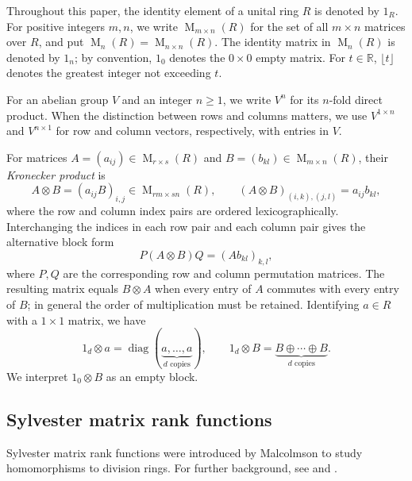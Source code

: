 \documentclass[11pt]{amsart}
\DeclareMathOperator{\Mat}{M}
\DeclareMathOperator{\diag}{diag}
\theoremstyle{definition}
\theoremstyle{remark}
\begin{document}
Throughout this paper, the identity element of a unital ring \(R\) is denoted by \(1_R\).
For positive integers \(m,n\), we write \(\Mat_{m\times n}(R)\) for the set of
all \(m\times n\) matrices over \(R\), and put \(\Mat_n(R)=\Mat_{n\times
  n}(R)\).
The identity matrix in \(\Mat_n(R)\) is denoted by \(1_n\); by convention,
\(1_0\) denotes the \(0\times0\) empty matrix.
For $t\in\mathbb R$, $\lfloor t\rfloor$ denotes the greatest integer
not exceeding $t$.

For an abelian group $V$ and an integer $n\geq1$, we write $V^n$ for its
$n$-fold direct product.
When the distinction between rows and columns matters, we use \(V^{1\times n}\)
and \(V^{n\times1}\) for row and column vectors, respectively, with entries in
\(V\).

For matrices $A=(a_{ij})\in\Mat_{r\times s}(R)$ and
$B=(b_{kl})\in\Mat_{m\times n}(R)$, their \emph{Kronecker product} is
\[
A\otimes B=(a_{ij}B)_{i,j}\in\Mat_{rm\times sn}(R),
\qquad
(A\otimes B)_{(i,k),(j,l)}=a_{ij}b_{kl},
\]
where the row and column index pairs are ordered lexicographically.
Interchanging the indices in each row pair and each column pair gives the
alternative block form
\[
 P(A\otimes B)Q=(A b_{kl})_{k,l},
\]
where $P,Q$ are the corresponding row and column permutation matrices.
The resulting matrix equals $B\otimes A$ when every entry of $A$
commutes with every entry of $B$; in general the order of multiplication must be retained.
Identifying $a\in R$ with a $1\times1$ matrix, we have
\[
 1_d\otimes a=\diag(\underbrace{a,\ldots,a}_{d\text{ copies}}),\qquad
 1_d\otimes B=\underbrace{B\oplus\cdots\oplus B}_{d\text{ copies}}.
\]
We interpret $1_0\otimes B$ as an empty block.

\subsection{Sylvester matrix rank functions}
\label{subsec:sylvester-ranks}

Sylvester matrix rank functions were introduced by Malcolmson
\cite{Malcolmson1980} to study homomorphisms to division rings.
For further background, see
\cite{JaikinZapirain2019,JiangLi2021,Li2021} and
\cite[Part~I, Chapter~7]{Schofield1985}.
\end{document}

